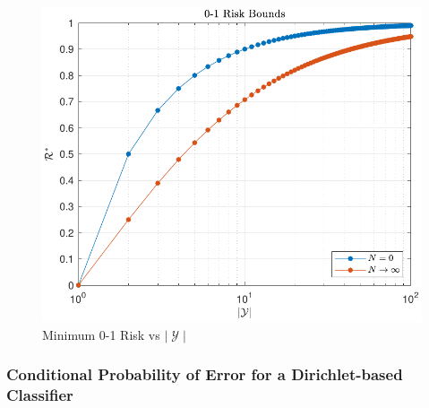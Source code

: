 \documentclass[12pt]{report}
\DeclareMathOperator{\Ycal}{\mathcal{Y}}
\begin{document}
\begin{figure}
\centering
\includegraphics[width=0.7\linewidth]{Risk_01_uni_N_bounds.pdf}
\caption{Minimum 0-1 Risk vs $|\Ycal|$}
\label{fig:Risk_01_uni_N_bounds}
\end{figure}






\subsubsection{Conditional Probability of Error for a Dirichlet-based Classifier}
\end{document}
